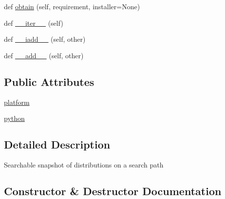 \begin{DoxyCompactItemize}
\item 
def \hyperlink{classpip_1_1__vendor_1_1pkg__resources_1_1Environment_a028e6fe4beeb40dd26ccc2bc5cf0b6e2}{obtain} (self, requirement, installer=None)
\item 
def \hyperlink{classpip_1_1__vendor_1_1pkg__resources_1_1Environment_a7d0345c80ba86cb4699ee1826135d67b}{\+\_\+\+\_\+iter\+\_\+\+\_\+} (self)
\item 
def \hyperlink{classpip_1_1__vendor_1_1pkg__resources_1_1Environment_ad026f479ac7031c92cf7cec14cef654f}{\+\_\+\+\_\+iadd\+\_\+\+\_\+} (self, other)
\item 
def \hyperlink{classpip_1_1__vendor_1_1pkg__resources_1_1Environment_af19db2a1b6a02b04c1aa294add7e9aad}{\+\_\+\+\_\+add\+\_\+\+\_\+} (self, other)
\end{DoxyCompactItemize}
\subsection*{Public Attributes}
\begin{DoxyCompactItemize}
\item 
\hyperlink{classpip_1_1__vendor_1_1pkg__resources_1_1Environment_a02c2c80bef7eff5fdc3f4b6de4602852}{platform}
\item 
\hyperlink{classpip_1_1__vendor_1_1pkg__resources_1_1Environment_a67849e2d8c8b3e2361254c87ccc96855}{python}
\end{DoxyCompactItemize}


\subsection{Detailed Description}
\begin{DoxyVerb}Searchable snapshot of distributions on a search path\end{DoxyVerb}
 

\subsection{Constructor \& Destructor Documentation}
\mbox{\label{classpip_1_1__vendor_1_1pkg__resources_1_1Environment_af54e9c1ac5e8f1e0bcfbbe6d3d5c2993}} 
